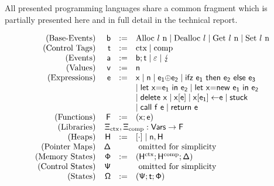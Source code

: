 \documentclass[acmsmall]{acmart}
\theoremstyle{definition}
\begin{document}
All presented programming languages share a common fragment which is partially presented here and in full detail in the technical report. 

{
  \renewcommand{\src}[1]{\mathsf{#1}}
 \small
\[
  \begin{array}{rrcl}
    \text{(Base-Events)} & \src{\preevent} &:=& \src{\ev{Alloc \loc\ n}} \mid \src{\ev{Dealloc \loc}} \mid \src{\ev{Get \loc\ n}} \mid \src{\ev{Set \loc\ n}} \\
    \text{(Control Tags)} & \src{\sandboxtag{}} &:=& \src{\ctx} \mid \src{\comp} \\
    \text{(Events)} & \src{\event} &:=& \src{\preevent;\sandboxtag{}} \mid \src{\emptyevent} \mid \src{\lightning} \\ 
    \text{(Values)} & \src{v} &:=& \src{n} \\
    \text{(Expressions)} & \src{\expr} &:=& \src{x} \mid \src{n} \mid \src{\lbinop{\expr[_1]}{\expr[_2]}} \mid \src{\lifz{\expr[_1]}{\expr[_2]}{\expr[_3]}} \\ 
                         &&&\mid \src{\llet{x}{\expr[_1]}{\expr[_2]}} \mid \src{\llet{x}{new\ \expr[_1]}{\expr[_2]}} \\
                         &&&\mid \src{\ldelete{x}} \mid \src{\lget{x}{\expr}} \mid \src{\lset{x}{\expr[_1]}{\expr[]}} \mid \src{stuck}\\
                         &&&\mid \src{\lcall{f}{\expr}} \mid \src{\lreturn{\expr}} \\
    \text{(Functions)} & \src{F} &:=& (\src{x};\src{\expr}) \\
    \text{(Libraries)} &&&\hspace{-3.8em} \src{\library_{\ctx}},\src{\library_{\comp}} : \src{Vars} \to \src{F} 
     \\
    \text{(Heaps)} & \src{H} &:=& \src{\hole{\cdot}} \mid \src{n},\src{H}
    \\
    \text{(Pointer Maps)} & \src{\Delta} && \text{ omitted for simplicity}
    \\
    \text{(Memory States)} & \src{\memstate} &:=& \left(\src{H^{\ctx}};\src{H^{\comp}};\src{\Delta}\right)\\
    \text{(Control States)} & \src{\cfstate} & & \text{ omitted for simplicity} 
    \\
    \text{(States)} &\src{\Omega} &:=& \left(\src{\cfstate};\src{\sandboxtag{}};\src{\memstate}\right)\\
  \end{array}
\]
}
\end{document}
